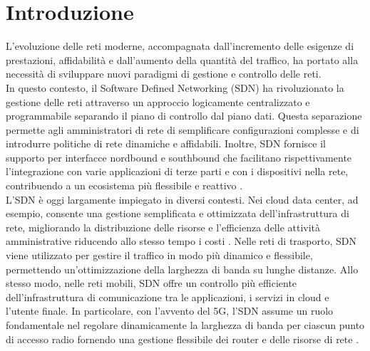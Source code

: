 \chapter{Introduzione}
L’evoluzione delle reti moderne, accompagnata dall’incremento delle esigenze di prestazioni, affidabilità e dall'aumento della quantità del traffico, ha portato alla necessità di sviluppare nuovi paradigmi di gestione e controllo delle reti. 
\\In questo contesto, il Software Defined Networking (SDN) ha rivoluzionato la gestione delle reti attraverso un approccio logicamente centralizzato e programmabile separando il piano di controllo dal piano dati.
Questa separazione permette agli amministratori di rete di semplificare configurazioni complesse e di introdurre politiche di rete dinamiche e affidabili.
Inoltre, SDN fornisce il supporto per interfacce nordbound e southbound che facilitano rispettivamente l'integrazione con varie applicazioni di terze parti e con i dispositivi nella rete, contribuendo a un ecosistema più flessibile e reattivo \cite{sdnart}.
\\L’SDN è oggi largamente impiegato in diversi contesti. 
Nei cloud data center, ad esempio, consente una gestione semplificata e ottimizzata dell’infrastruttura di rete, migliorando la distribuzione delle risorse e l'efficienza  delle attività amministrative riducendo allo stesso tempo i costi \cite{datacent}. 
Nelle reti di trasporto, SDN viene utilizzato per gestire il traffico in modo più dinamico e flessibile, permettendo un'ottimizzazione della larghezza di banda su lunghe distanze. Allo stesso modo, 
nelle reti mobili, SDN offre un controllo più efficiente dell'infrastruttura di comunicazione
tra le applicazioni, i servizi in cloud e l'utente finale. 
In particolare, con l'avvento del 5G, l'SDN assume un ruolo fondamentale nel regolare dinamicamente la larghezza di banda per ciascun punto di accesso radio fornendo una gestione flessibile dei router e delle risorse di rete\cite{5g} \cite{5gart}.
